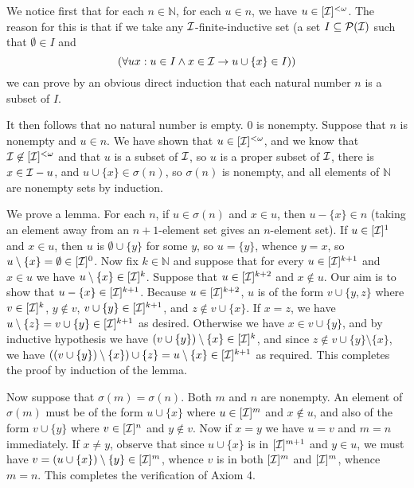 \documentclass[12pt]{book}
\begin{document}
\begin{description}
\begin{description}
We notice first that for each $n \in \mathbb N$, for each $u \in n$, we have $u \in [{\cal I}]^{<\omega}$.  The reason for this is that if we take any $\cal I$-finite-inductive set
(a set $I \subseteq {\cal P}({\cal I})$ such that $\emptyset \in I$ and $$(\forall ux:u \in I \wedge x \in {\cal I} \rightarrow u \cup \{x\} \in I))$$ we can prove by an obvious direct induction that each natural number $n$ is a subset of $I$.

It then follows that no natural number is empty.  0 is nonempty.  Suppose that $n$ is nonempty and $u \in n$.  We have shown that $u \in [{\cal I}]^{<\omega}$, and we know that 
${\cal I} \not\in [{\cal I}]^{<\omega}$ and that $u$ is a subset of $\cal I$, so $u$ is a proper subset of $\cal I$, there is $x \in {\cal I} -u$, and $u \cup \{x\} \in \sigma(n)$, so $\sigma(n)$ is nonempty, and all elements of $\mathbb N$ are nonempty sets by induction.

We prove a lemma.  For each $n$, if $u \in \sigma(n)$ and $x \in u$, then $u - \{x\} \in n$ (taking an element away from an $n+1$-element set gives an $n$-element set).  If $u \in [{\cal I}]^{1}$ and $x \in u$, then $u$ is $\emptyset \cup \{y\}$ for some $y$, so $u = \{y\}$, whence $y=x$, so $u \setminus \{x\} = \emptyset \in [{\cal I}]^0$.  Now fix $k \in \mathbb N$ and suppose that for every $u \in [{\cal I}]^{k+1}$ and $x \in u$ we have $u \setminus \{x\} \in [{\cal I}]^k$.  Suppose that $u \in [{\cal I}]^{k+2}$ and $x \not\in u$.  Our aim is to show that $u-\{x\}\in [{\cal I}]^{k+1}$.  Because $u \in [{\cal I}]^{k+2}$, $u$ is of the form $v \cup \{y,z\}$ where $v \in [{\cal I}]^k$, $y \not\in v$, $v \cup \{y\} \in [{\cal I}]^{k+1}$, and $z \not\in v \cup \{x\}$.  If $x=z$, we have $u \setminus \{z\} = v \cup \{y\} \in [{\cal I}]^{k+1}$ as desired.  Otherwise we have $x \in v \cup \{y\}$, and by inductive hypothesis we have $(v \cup \{y\}) \setminus \{x\} \in [{\cal I}]^{k}$, and since $z \not\in v \cup \{y\} \setminus \{x\}$, we have $((v \cup \{y\}) \setminus \{x\})\cup \{z\} = u \setminus \{x\} \in [{\cal I}]^{k+1}$ as required.  This completes the proof by induction of the lemma.

Now suppose that $\sigma(m)=\sigma(n)$.   Both $m$ and $n$ are nonempty.  An element of $\sigma(m)$ must be of the form $u \cup \{x\}$ where $u \in [{\cal I}]^m$ and $x \not\in u$, and also of the form $v \cup \{y\}$ where $v \in [{\cal I}]^n$ and $y \not\in v$.  Now if $x=y$ we have $u=v$ and $m=n$ immediately.   If $x \neq y$, observe that since $u \cup \{x\}$ is in $[{\cal I}]^{m+1}$ and $y \in u$, we must have $v=(u \cup \{x\})\setminus \{y\} \in [{\cal I}]^m$, whence $v$ is in both $[{\cal I}]^m$ and $[{\cal I}]^m$, whence $m=n$.  This completes the verification of Axiom 4.

\end{description}

\end{description}
\end{document}
